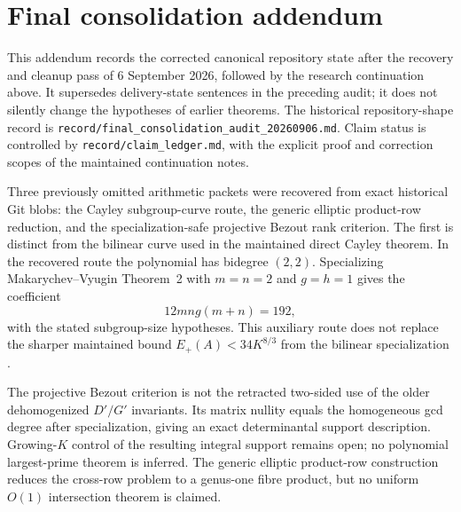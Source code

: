 








\section{Final consolidation addendum}
\label{sec:final-consolidation-addendum}
This addendum records the corrected canonical repository state after the
recovery and cleanup pass of 6 September 2026, followed by the research
continuation above. It supersedes delivery-state sentences in the preceding
audit; it does not silently change the hypotheses of earlier theorems.
The historical repository-shape record is
\texttt{record/final\_consolidation\_audit\_20260906.md}.
Claim status is controlled by \texttt{record/claim\_ledger.md}, with the
explicit proof and correction scopes of the maintained continuation notes.

Three previously omitted arithmetic packets were recovered from exact
historical Git blobs: the Cayley subgroup-curve route, the generic elliptic
product-row reduction, and the specialization-safe projective Bezout rank
criterion. The first is distinct from the bilinear curve used in the
maintained direct Cayley theorem. In the recovered route the polynomial has
bidegree $(2,2)$. Specializing Makarychev--Vyugin Theorem~2 with $m=n=2$ and
$g=h=1$ gives the coefficient
\[
 12mng(m+n)=192,
\]
with the stated subgroup-size hypotheses. This auxiliary route does not
replace the sharper maintained bound $E_+(A)<34K^{8/3}$ from the bilinear
specialization \cite{VM2015,MV2019}.

The projective Bezout criterion is not the retracted two-sided use of the older
dehomogenized $D'/G'$ invariants. Its matrix nullity equals the homogeneous
gcd degree after specialization, giving an exact determinantal support
description. Growing-$K$ control of the resulting integral support remains
open; no polynomial largest-prime theorem is inferred. The generic elliptic
product-row construction reduces the cross-row problem to a genus-one fibre
product, but no uniform $O(1)$ intersection theorem is claimed.

